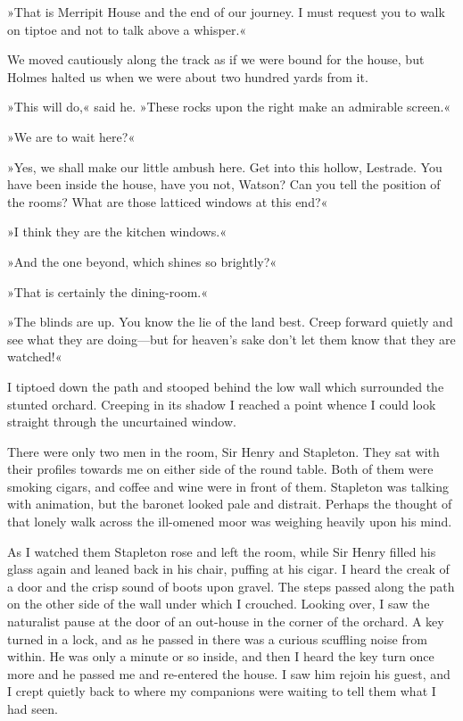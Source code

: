 »That is Merripit House and the end of our journey. I must request you to walk on tiptoe and not to talk above a whisper.«

We moved cautiously along the track as if we were bound for the house, but Holmes halted us when we were about two hundred yards from it.

»This will do,« said he. »These rocks upon the right make an admirable screen.«

»We are to wait here?«

»Yes, we shall make our little ambush here. Get into this hollow, Lestrade. You have been inside the house, have you not, Watson? Can you tell the position of the rooms? What are those latticed windows at this end?«

»I think they are the kitchen windows.«

»And the one beyond, which shines so brightly?«

»That is certainly the dining-room.«

»The blinds are up. You know the lie of the land best. Creep forward quietly and see what they are doing—but for heaven's sake don't let them know that they are watched!«

I tiptoed down the path and stooped behind the low wall which surrounded the stunted orchard. Creeping in its shadow I reached a point whence I could look straight through the uncurtained window.

There were only two men in the room, Sir Henry and Stapleton. They sat with their profiles towards me on either side of the round table. Both of them were smoking cigars, and coffee and wine were in front of them. Stapleton was talking with animation, but the baronet looked pale and distrait. Perhaps the thought of that lonely walk across the ill-omened moor was weighing heavily upon his mind.

As I watched them Stapleton rose and left the room, while Sir Henry filled his glass again and leaned back in his chair, puffing at his cigar. I heard the creak of a door and the crisp sound of boots upon gravel. The steps passed along the path on the other side of the wall under which I crouched. Looking over, I saw the naturalist pause at the door of an out-house in the corner of the orchard. A key turned in a lock, and as he passed in there was a curious scuffling noise from within. He was only a minute or so inside, and then I heard the key turn once more and he passed me and re-entered the house. I saw him rejoin his guest, and I crept quietly back to where my companions were waiting to tell them what I had seen.

